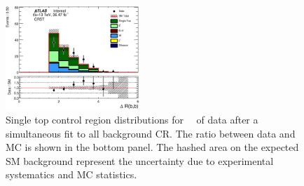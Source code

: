 \begin{figure}[htbp]
\begin{center}
\includegraphics[width=0.45\textwidth]{figures/singleTop/postfit/DRBB_CRST.eps}
\end{center}
\caption{Single top control region distributions for \intlumi\ \ifb\ of data after a simultaneous fit to all background CR. The ratio between data and MC is shown in the bottom panel. The hashed area on the expected SM background represent the uncertainty due to experimental systematics and MC statistics.}
\label{fig:CRST}
\end{figure}


\clearpage